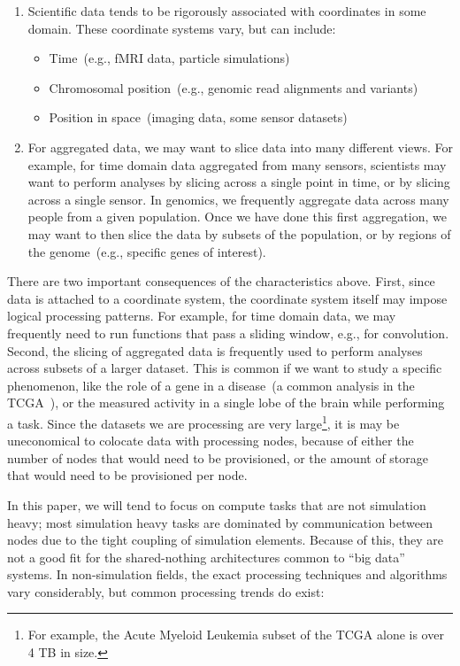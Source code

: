 \documentclass{acm_proc_article-sp}
\begin{document}
\begin{enumerate}
\item Scientific data tends to be rigorously associated with coordinates in some domain. These coordinate
systems vary, but can include:
\begin{itemize}
\item Time~(e.g., fMRI data, particle simulations)
\item Chromosomal position~(e.g., genomic read alignments and variants)
\item Position in space~(imaging data, some \linebreak sensor datasets)
\end{itemize}
\item For aggregated data, we may want to slice data into many different views. For example, for time
domain data aggregated from many sensors, scientists may want to perform analyses by slicing across a
single point in time, or by slicing across a single sensor. In genomics, we frequently aggregate data across
many people from a given population. Once we have done this first aggregation, we may want to then
slice the data by subsets of the population, or by regions of the genome~(e.g., specific genes of interest).
\end{enumerate}

There are two important consequences of the characteristics above. First, since data is attached to a
coordinate system, the coordinate system itself may impose logical processing patterns. For example, for
time domain data, we may frequently need to run functions that pass a sliding window, e.g., for
convolution. Second, the slicing of aggregated data is frequently used to perform analyses across
subsets of a larger dataset. This is common if we want to study a specific phenomenon, like the role of a
gene in a disease~(a common analysis in the TCGA~\cite{weinstein13}), or the measured activity in a
single lobe of the brain while performing a task. Since the datasets we are processing are very
large\footnote{For example, the Acute Myeloid Leukemia subset of the TCGA alone is over 4 TB in size.},
it is may be uneconomical to colocate data with processing nodes, because of either the number of
nodes that would need to be provisioned, or the amount of storage that would need to be provisioned
per node.

In this paper, we will tend to focus on compute tasks that are not simulation heavy; most simulation heavy
tasks are dominated by communication between nodes due to the tight coupling of simulation elements.
Because of this, they are not a good fit for the shared-nothing architectures common to ``big data''
systems. In non-simulation fields, the exact processing techniques and algorithms vary considerably, but
common processing trends do exist:
\end{document}
